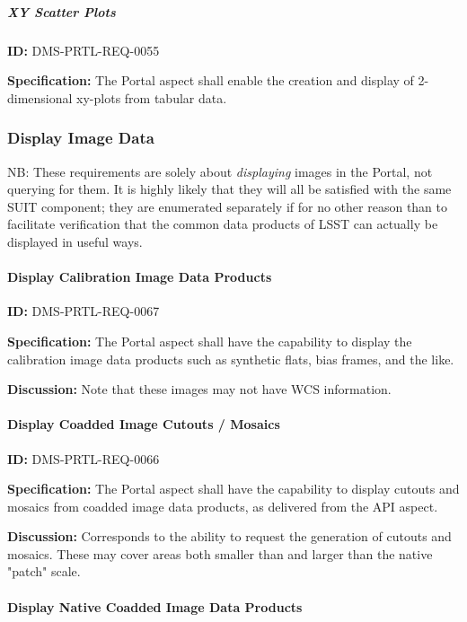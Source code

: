 \documentclass[SE,toc,lsstdraft]{lsstdoc}
\begin{document}
\subparagraph{XY Scatter Plots}\hfill  %

\label{DMS-PRTL-REQ-0055}
\textbf{ID:} DMS-PRTL-REQ-0055

\textbf{Specification:}
The Portal aspect shall enable the creation and display of 2-dimensional xy-plots from tabular data.

\subsubsection{Display Image Data}

NB: These requirements are solely about \textit{displaying} images in the Portal, not querying for them. It is highly likely that they will all be satisfied with the same SUIT component; they are enumerated separately if for no other reason than to facilitate verification that the common data products of LSST can actually be displayed in useful ways.

\paragraph{Display Calibration Image Data Products}\hfill  %

\label{DMS-PRTL-REQ-0067}
\textbf{ID:} DMS-PRTL-REQ-0067

\textbf{Specification:}
The Portal aspect shall have the capability to display the calibration image data products such as synthetic flats, bias frames, and the like.

\textbf{Discussion:}
Note that these images may not have WCS information.

\paragraph{Display Coadded Image Cutouts / Mosaics}\hfill  %

\label{DMS-PRTL-REQ-0066}
\textbf{ID:} DMS-PRTL-REQ-0066

\textbf{Specification:}
The Portal aspect shall have the capability to display cutouts and mosaics from coadded image data products, as delivered from the API aspect.

\textbf{Discussion:}
Corresponds to the ability to request the generation of cutouts and mosaics.  These may cover areas both smaller than and larger than the native "patch" scale.

\paragraph{Display Native Coadded Image Data Products}\hfill  %
\end{document}
